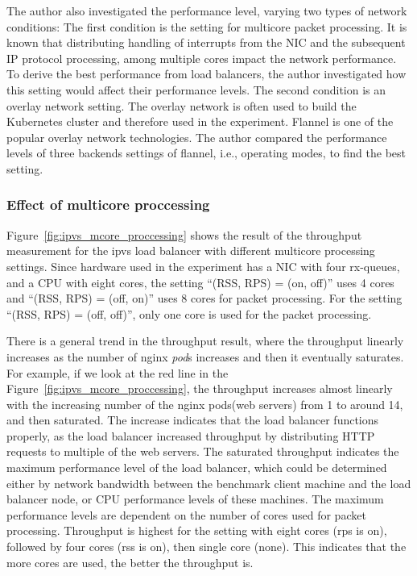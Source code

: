 The author also investigated the performance level, varying two types of network conditions:
The first condition is the setting for multicore packet processing.
It is known that distributing handling of interrupts from the NIC and the subsequent IP protocol processing, among multiple cores impact the network performance.
To derive the best performance from load balancers, the author investigated how this setting would affect their performance levels.
The second condition is an overlay network setting\cite{Sill2016,Marmol2015}.
The overlay network is often used to build the Kubernetes cluster and therefore used in the experiment.
Flannel\cite{CoreOSFlannel} is one of the popular overlay network technologies. 
The author compared the performance levels of three backends settings\cite{CoreOSFlannelBackend} of flannel, i.e., operating modes, to find the best setting.

\FloatBarrier

\subsubsection{Effect of multicore proccessing}

Figure~\ref{fig:ipvs_mcore_proccessing} shows the result of the throughput measurement for the ipvs load balancer with different multicore processing settings.
Since hardware used in the experiment has a NIC with four rx-queues, and a CPU with eight cores,
the setting \enquote{(RSS, RPS) = (on, off)} uses 4 cores and \enquote{(RSS, RPS) = (off, on)} uses 8 cores for packet processing.
For the setting \enquote{(RSS, RPS) = (off, off)}, only one core is used for the packet processing.

There is a general trend in the throughput result, where the throughput linearly increases as the number of nginx {\em pod}s increases and then it eventually saturates.
For example, if we look at the red line in the Figure~\ref{fig:ipvs_mcore_proccessing}, the throughput increases almost linearly with the increasing number of the nginx pods(web servers) from 1 to around 14, and then saturated.
The increase indicates that the load balancer functions properly, as the load balancer increased throughput by distributing HTTP requests to multiple of the web servers.
%
The saturated throughput indicates the maximum performance level of the load balancer, which could be determined either by network bandwidth between the benchmark client machine and the load balancer node, or CPU performance levels of these machines.
%
The maximum performance levels are dependent on the number of cores used for packet processing.
Throughput is highest for the setting with eight cores (rps is on), followed by four cores (rss is on), then single core (none).
This indicates that the more cores are used, the better the throughput is.

